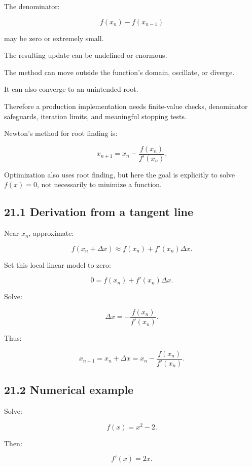 The denominator:

\[ f(x_n)-f(x_{n-1}) \]

may be zero or extremely small.

The resulting update can be undefined or enormous.

The method can move outside the function's domain, oscillate, or diverge.

It can also converge to an unintended root.

Therefore a production implementation needs finite-value checks, denominator safeguards, iteration limits, and meaningful stopping tests.

Newton's method for root finding is:

\[ \boxed{ x_{n+1} = x_n-\frac{f(x_n)}{f'(x_n)} }. \]

Optimization also uses root finding, but here the goal is explicitly to solve \(f(x)=0\), not necessarily to minimize a function.

\subsection{21.1 Derivation from a tangent line}\label{02-foundations-ii-ch028-derivation-from-a-tangent-line}

\hypertarget{02-foundations-ii-ch028-derivation-from-a-tangent-line}{}

Near \(x_n\), approximate:

\[ f(x_n+\Delta x) \approx f(x_n)+f'(x_n)\Delta x. \]

Set this local linear model to zero:

\[ 0=f(x_n)+f'(x_n)\Delta x. \]

Solve:

\[ \Delta x=-\frac{f(x_n)}{f'(x_n)}. \]

Thus:

\[ x_{n+1}=x_n+\Delta x = x_n-\frac{f(x_n)}{f'(x_n)}. \]

\subsection{21.2 Numerical example}\label{02-foundations-ii-ch028-numerical-example-3}

\hypertarget{02-foundations-ii-ch028-numerical-example-3}{}

Solve:

\[ f(x)=x^2-2. \]

Then:

\[ f'(x)=2x. \]

